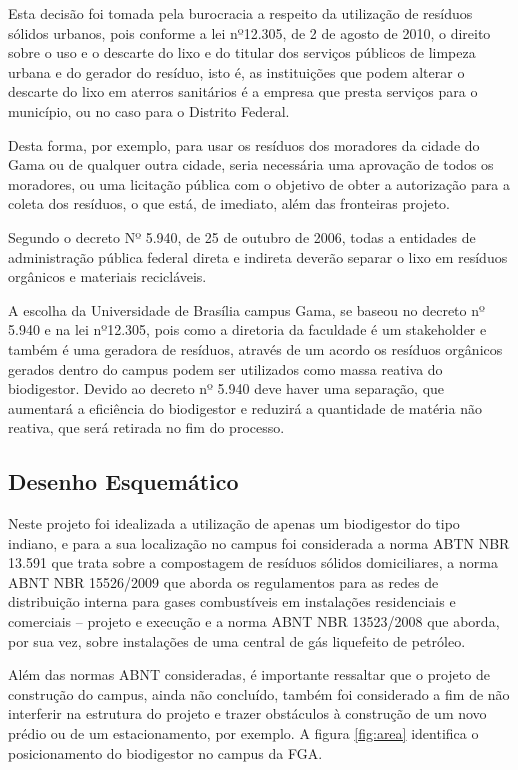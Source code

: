 \par Esta decisão foi tomada pela burocracia a respeito da utilização de resíduos sólidos urbanos, pois conforme a lei nº12.305, de 2 de agosto de 2010, o direito sobre o uso e o descarte do lixo e do titular dos serviços públicos de limpeza urbana e do gerador do resíduo, isto é, as instituições que podem alterar o descarte do lixo em aterros sanitários é a empresa que presta serviços para o município, ou no caso para o Distrito Federal.
\par Desta forma, por exemplo, para usar os resíduos dos moradores da cidade do Gama ou de qualquer outra cidade, seria necessária uma aprovação de todos os moradores, ou uma licitação pública com o objetivo de obter a autorização para a coleta dos resíduos, o que está, de imediato, além das fronteiras projeto.
\par Segundo o decreto Nº 5.940, de 25 de outubro de 2006, todas a entidades de administração pública federal direta e indireta deverão separar o lixo em resíduos orgânicos e materiais recicláveis.
\par A escolha da Universidade de Brasília campus Gama, se baseou no decreto nº 5.940 e na lei nº12.305, pois como a diretoria da faculdade é um stakeholder e também é uma geradora de resíduos, através de um acordo os resíduos orgânicos gerados dentro do campus podem ser utilizados como massa reativa do biodigestor. Devido ao decreto nº 5.940 deve haver uma separação, que aumentará a eficiência do biodigestor e reduzirá a quantidade de matéria não reativa, que será retirada no fim do processo.

\subsection {Desenho Esquemático}
Neste projeto foi idealizada a utilização de apenas um biodigestor do tipo indiano, e para a sua localização no campus foi considerada a norma ABTN NBR 13.591 que trata sobre a compostagem de resíduos sólidos domiciliares, a norma ABNT NBR 15526/2009 que aborda os regulamentos para as redes de distribuição interna para gases combustíveis em instalações residenciais e comerciais – projeto e execução e a norma ABNT NBR 13523/2008 que aborda, por sua vez, sobre instalações de uma central de gás liquefeito de petróleo.
\par Além das normas ABNT consideradas, é importante ressaltar que o projeto de construção do campus, ainda não concluído, também foi considerado a fim de não interferir na estrutura do projeto e trazer obstáculos à construção de um novo prédio ou de um estacionamento, por exemplo. A figura \ref{fig:area} identifica o posicionamento do biodigestor no campus da FGA.

